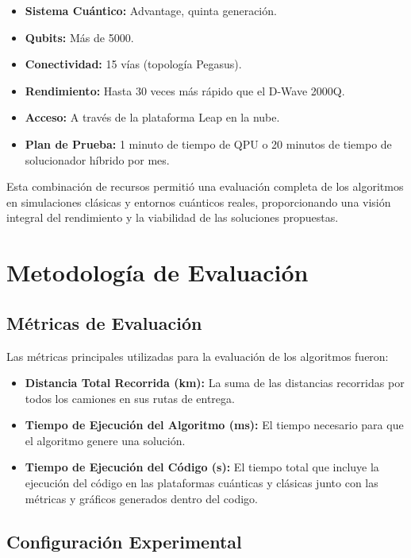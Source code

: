 \documentclass[11pt,a4paper,spanish]{book}
\begin{document}
\begin{itemize}
    \item \textbf{Sistema Cuántico:} Advantage, quinta generación.
    \item \textbf{Qubits:} Más de 5000.
    \item \textbf{Conectividad:} 15 vías (topología Pegasus).
    \item \textbf{Rendimiento:} Hasta 30 veces más rápido que el D-Wave 2000Q.
    \item \textbf{Acceso:} A través de la plataforma Leap en la nube.
    \item \textbf{Plan de Prueba:} 1 minuto de tiempo de QPU o 20 minutos de tiempo de solucionador híbrido por mes.
\end{itemize}



Esta combinación de recursos permitió una evaluación completa de los algoritmos en simulaciones clásicas y entornos cuánticos reales, proporcionando una visión integral del rendimiento y la viabilidad de las soluciones propuestas.


\section{Metodología de Evaluación}


\subsection{Métricas de Evaluación}

Las métricas principales utilizadas para la evaluación de los algoritmos fueron:

\begin{itemize}
    \item \textbf{Distancia Total Recorrida (km):} La suma de las distancias recorridas por todos los camiones en sus rutas de entrega.
    \item \textbf{Tiempo de Ejecución del Algoritmo (ms):} El tiempo necesario para que el algoritmo genere una solución.
    \item \textbf{Tiempo de Ejecución del Código (s):} El tiempo total que incluye la ejecución del código en las plataformas cuánticas y clásicas junto con las métricas y gráficos generados dentro del codigo.
\end{itemize}

\subsection{Configuración Experimental}
\end{document}
